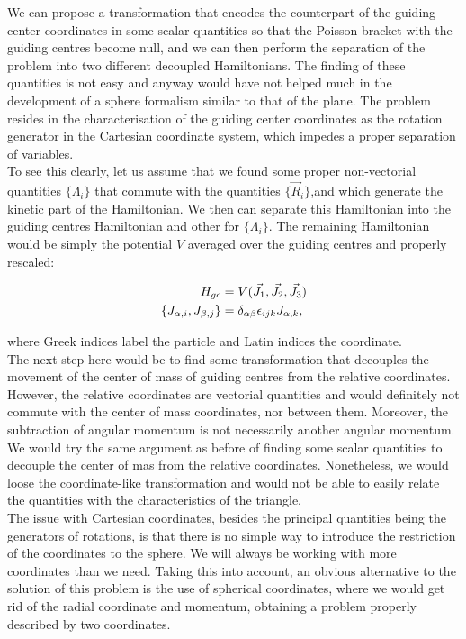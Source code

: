 We can propose a transformation that encodes the counterpart of the guiding center coordinates in some scalar quantities so that the Poisson bracket with the guiding centres become null, and we can then perform the separation of the problem into two different decoupled Hamiltonians. The finding of these quantities is not easy and anyway would have not helped much in the development of a sphere formalism similar to that of the plane. The problem resides in the characterisation of the guiding center coordinates as the rotation generator in the Cartesian coordinate system, which impedes a proper separation of variables.\\

To see this clearly, let us assume that we found some proper non-vectorial quantities $\{\Lambda_i\}$ that commute with the quantities $\{\vec{R}_i\}$,and which generate the kinetic part of the Hamiltonian. We then can separate this Hamiltonian into the guiding centres Hamiltonian and other for $\{\Lambda_i\}$. The remaining Hamiltonian would be simply the potential $V$ averaged over the guiding centres and properly rescaled:

\begin{align*}
H_{gc} &= V(\vec{J_1},\vec{J_2},\vec{J_3})\\
\left\lbrace J_{\alpha,i}, J_{\beta,j} \right\rbrace &= \delta_{\alpha\beta}\epsilon_{ijk} J_{\alpha,k},
\end{align*}

where Greek indices label the particle and Latin indices the coordinate. \\

The next step here would be to find some transformation that decouples the movement of the center of mass of guiding centres from the relative coordinates. However, the relative coordinates are vectorial quantities and would definitely not commute with the center of mass coordinates, nor between them. Moreover, the subtraction of angular momentum is not necessarily another angular momentum. \\

We would try the same argument as before of finding some scalar quantities to decouple the center of mas from the relative coordinates. Nonetheless, we would loose the coordinate-like transformation and would not be able to easily relate the quantities with the characteristics of the triangle.\\

The issue with Cartesian coordinates, besides the principal quantities being the generators of rotations, is that there is no simple way to introduce the restriction of the coordinates to the sphere. We will always be working with more coordinates than we need. Taking this into account, an obvious alternative to the solution of this problem is the use of spherical coordinates, where we would get rid of the radial coordinate and momentum, obtaining a problem properly described by two coordinates.\\ 

